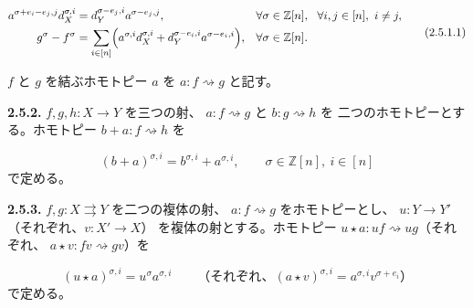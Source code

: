 \begin{equation}
  \begin{aligned}
    a^{\sigma+e_i-e_j,j}d_X^{\sigma,i}
      &=d_Y^{\sigma-e_j,i}a^{\sigma-e_j,j},
      &&\forall\sigma\in\mathbb Z[n],\
        \ \forall i,j\in[n],\ i\ne j,\\
    g^\sigma-f^\sigma
      &=\sum_{i\in[n]}\Bigl(
          a^{\sigma,i}d_X^{\sigma,i}
          +d_Y^{\sigma-e_i,i}a^{\sigma-e_i,i}\Bigr),
      &&\forall\sigma\in\mathbb Z[n].
  \end{aligned}
  \tag{2.5.1.1}
\end{equation}

$f$ と $g$ を結ぶホモトピー $a$ を $a\colon f\rightsquigarrow g$ と記す。

\noindent\textbf{2.5.2.}\quad
$f,g,h\colon X\longrightarrow Y$ を三つの射、
$a\colon f\rightsquigarrow g$ と $b\colon g\rightsquigarrow h$ を
二つのホモトピーとする。ホモトピー
$b+a\colon f\rightsquigarrow h$ を

\begin{equation*}
  (b+a)^{\sigma,i}=b^{\sigma,i}+a^{\sigma,i},
  \qquad \sigma\in\mathbb Z[n],\ i\in[n]
\end{equation*}
で定める。

\noindent\textbf{2.5.3.}\quad
$f,g\colon X\rightrightarrows Y$ を二つの複体の射、
$a\colon f\rightsquigarrow g$ をホモトピーとし、
$u\colon Y\longrightarrow Y'$（それぞれ、$v\colon X'\longrightarrow X$）
を複体の射とする。ホモトピー
$u\star a\colon uf\rightsquigarrow ug$（それぞれ、
$a\star v\colon fv\rightsquigarrow gv$）を

\begin{equation*}
  (u\star a)^{\sigma,i}=u^\sigma a^{\sigma,i}
  \qquad
  \text{（それぞれ、}(a\star v)^{\sigma,i}
    =a^{\sigma,i}v^{\sigma+e_i}\text{）}
\end{equation*}
で定める。
